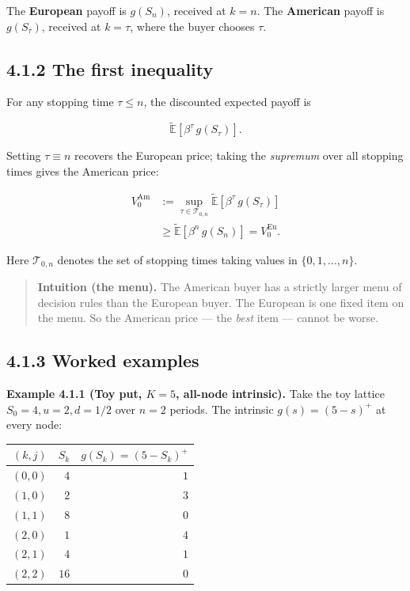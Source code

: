 \documentclass[
  10pt,
  twoside]{book}
\newcounter{none} %
\begin{document}
The \textbf{European} payoff is \(g(S_n)\), received at \(k = n\). The
\textbf{American} payoff is \(g(S_\tau)\), received at \(k = \tau\),
where the buyer chooses \(\tau\).

\subsection{4.1.2 The first inequality}\label{the-first-inequality}

For any stopping time \(\tau \le n\), the discounted expected payoff is

\[\tilde{\mathbb{E}}\!\left[\beta^\tau\, g(S_\tau)\right].\]

Setting \(\tau \equiv n\) recovers the European price; taking the
\emph{supremum} over all stopping times gives the American price:

\[\boxed{\;\begin{aligned}
V_0^{\text{Am}} &:= \sup_{\tau \in \mathcal{T}_{0,n}} \tilde{\mathbb{E}}\!\left[\beta^\tau\, g(S_\tau)\right] \\
&\ge \tilde{\mathbb{E}}\!\left[\beta^n\, g(S_n)\right] = V_0^{\text{Eu}}.
\end{aligned}\;}\]

Here \(\mathcal{T}_{0,n}\) denotes the set of stopping times taking
values in \(\{0, 1, \dots, n\}\).

\begin{quote}
\textbf{Intuition (the menu).} The American buyer has a strictly larger
menu of decision rules than the European buyer. The European is one
fixed item on the menu. So the American price --- the \emph{best} item
--- cannot be worse.
\end{quote}

\subsection{4.1.3 Worked examples}\label{worked-examples}

\textbf{Example 4.1.1 (Toy put, \(K=5\), all-node intrinsic).} Take the
toy lattice \(S_0 = 4, u = 2, d = 1/2\) over \(n = 2\) periods. The
intrinsic \(g(s) = (5 - s)^+\) at every node:

{\def\LTcaptype{none} %
\begin{table}[H]
\centering
\begin{tabular}{|r|r|r|}
\toprule
\((k, j)\) & \(S_k\) & \(g(S_k) = (5 - S_k)^+\) \\
\midrule



\((0, 0)\) & \(4\) & \(1\) \\
\((1, 0)\) & \(2\) & \(3\) \\
\((1, 1)\) & \(8\) & \(0\) \\
\((2, 0)\) & \(1\) & \(4\) \\
\((2, 1)\) & \(4\) & \(1\) \\
\((2, 2)\) & \(16\) & \(0\) \\
\bottomrule
\end{tabular}
\end{table}
}
\end{document}
